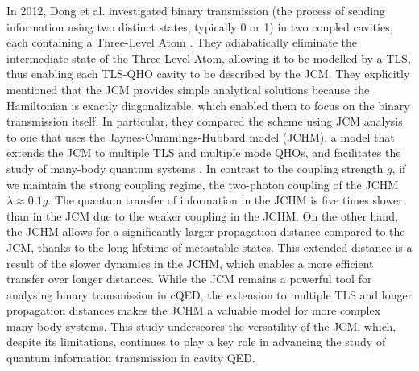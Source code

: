 \documentclass[12pt,a4paper]{article}
\begin{document}
In 2012, Dong et al. investigated binary transmission (the process of sending information using two distinct states, typically 0 or 1) in two coupled cavities, each containing a Three-Level Atom \cite{Context2012-CQED_JCM}. They adiabatically eliminate the intermediate state of the Three-Level Atom, allowing it to be modelled by a TLS, thus enabling each TLS-QHO cavity to be described by the JCM. They explicitly mentioned that the JCM provides simple analytical solutions because the Hamiltonian is exactly diagonalizable, which enabled them to focus on the binary transmission itself. In particular, they compared the scheme using JCM analysis to one that uses the Jaynes-Cummings-Hubbard model (JCHM), a model that extends the JCM to multiple TLS and multiple mode QHOs, and facilitates the study of many-body quantum systems \cite{Context2007-JCH_1,Context2006-JCH_2,Context2006-JCH_3}. In contrast to the coupling strength $g$, if we maintain the strong coupling regime, the two-photon coupling of the JCHM $\lambda\approx0.1g$. The quantum transfer of information in the JCHM is five times slower than in the JCM due to the weaker coupling in the JCHM. On the other hand, the JCHM allows for a significantly larger propagation distance compared to the JCM, thanks to the long lifetime of metastable states. This extended distance is a result of the slower dynamics in the JCHM, which enables a more efficient transfer over longer distances. While the JCM remains a powerful tool for analysing binary transmission in cQED, the extension to multiple TLS and longer propagation distances makes the JCHM a valuable model for more complex many-body systems. This study underscores the versatility of the JCM, which, despite its limitations, continues to play a key role in advancing the study of quantum information transmission in cavity QED.\\
\\
\end{document}
